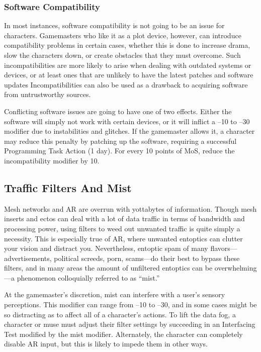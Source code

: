 \subsubsection{Software Compatibility}

In most instances, software compatibility is not going 
to be an issue for characters. Gamemasters who like 
it as a plot device, however, can introduce compatibility
problems in certain cases, whether this is done
to increase drama, slow the characters down, or create 
obstacles that they must overcome. Such incompatibilities
are more likely to arise when dealing with
outdated systems or devices, or at least ones that are 
unlikely to have the latest patches and software updates
Incompatibilities can also be used as a drawback
to acquiring software from untrustworthy sources.

Conflicting software issues are going to have one of 
two effects. Either the software will simply not work 
with certain devices, or it will inflict a –10 to –30 
modifier due to instabilities and glitches. If the gamemaster
allows it, a character may reduce this penalty
by patching up the software, requiring a successful 
Programming Task Action (1 day). For every 10 points 
of MoS, reduce the incompatibility modifier by 10.

\subsection{Traffic Filters And Mist}

Mesh networks and AR are overrun with yottabytes of 
information. Though mesh inserts and ectos can deal 
with a lot of data traffic in terms of bandwidth and 
processing power, using filters to weed out unwanted 
traffic is quite simply a necessity. This is especially true 
of AR, where unwanted entoptics can clutter your 
vision and distract you. Nevertheless, entoptic spam of 
many flavors—advertisements, political screeds, porn, 
scams—do their best to bypass these filters, and in 
many areas the amount of unfiltered entoptics can be 
overwhelming—a phenomenon colloquially referred 
to as ``mist.''

At the gamemaster's discretion, mist can interfere 
with a user's sensory perceptions. This modifier can 
range from –10 to –30, and in some cases might be 
so distracting as to affect all of a character's actions. 
To lift the data fog, a character or muse must adjust 
their filter settings by succeeding in an Interfacing Test 
modified by the mist modifier. Alternately, the character
can completely disable AR input, but this is likely
to impede them in other ways.

